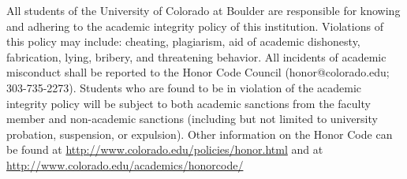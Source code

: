 \documentclass[]{article}
\begin{document}
All students of the University of Colorado at Boulder are responsible for
knowing and adhering to the academic integrity policy of this institution.
Violations of this policy may include: cheating, plagiarism, aid of academic
dishonesty, fabrication, lying, bribery, and threatening behavior.  All
incidents of academic misconduct shall be reported to the Honor Code Council
(honor@colorado.edu; 303-735-2273). Students who are found to be in violation
of the academic integrity policy will be subject to both academic sanctions
from the faculty member and non-academic sanctions (including but not limited
to university probation, suspension, or expulsion). Other information on the
Honor Code can be found at \url{http://www.colorado.edu/policies/honor.html}  and at
\url{http://www.colorado.edu/academics/honorcode/}
\end{document}
